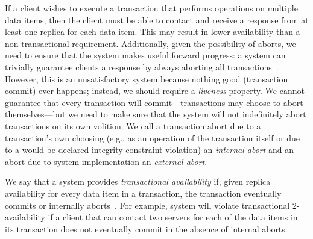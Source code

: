 If a client wishes to execute a transaction that performs operations
on multiple data items, then the client must be able to contact and
receive a response from at least one replica for each data item. This
may result in lower availability than a non-transactional
requirement. Additionally, given the possibility of aborts, we need to
ensure that the system makes useful forward progress: a system can
trivially guarantee clients a response by always aborting all
transactions~\cite{transaction-liveness}. However, this is an
unsatisfactory system because nothing good (transaction commit) ever
happens; instead, we should require a \textit{liveness} property. We
cannot guarantee that every transaction will commit---transactions may
choose to abort themselves---but we need to make sure that the system
will not indefinitely abort transactions on its own volition. We call
a transaction abort due to a transaction's own choosing (e.g., as an
operation of the transaction itself or due to a would-be declared
integrity constraint violation) an \textit{internal abort} and an
abort due to system implementation an \textit{external abort}.

We say that a system provides \textit{transactional availability} if,
given replica availability for every data item in a transaction, the
transaction eventually commits or internally
aborts~\cite{hat-hotos}. For example, system will violate
transactional $2$-availability if a client that can contact two
servers for each of the data items in its transaction does not
eventually commit in the absence of internal aborts.

